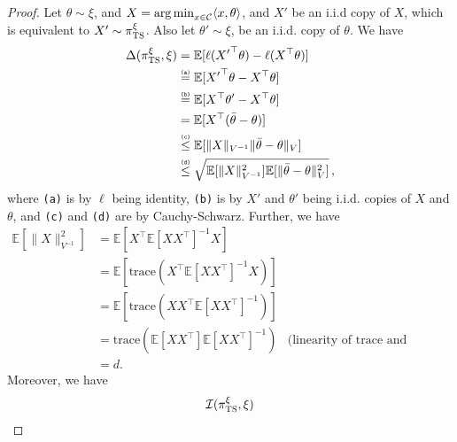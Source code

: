 \documentclass[letter, 12pt]{report}
\newcommand{\argmin}{\operatornamewithlimits{arg\,min}}
\newcommand{\explan}[1]{\stackrel{\text{\tiny \texttt{#1}}}}
\newcommand{\E}{\mathbb E}
\newcommand{\cC}{\mathcal C}
\newcommand{\I}{\mathcal{I}}
\newcommand{\1}{\mathbf{1}}
\newcommand{\ts}{\textsc{TS}\xspace}
\theoremstyle{plain}
\theoremstyle{definition}
\theoremstyle{remark}
\begin{document}
\begin{proof}
    Let $\theta \sim \xi$, and
    $X = \argmin_{x \in \cC} \langle x, \theta\rangle$,
    and $X'$ be an i.i.d copy of $X$, which is equivalent
    to $X' \sim \pi_\ts^\xi$. Also let $\theta' \sim \xi$,
    be an i.i.d. copy of $\theta$. We have
    \begin{align*}
        \Delta(\pi^\xi_\ts, \xi)
         & =
        \E[
            \ell({X'}^\top \theta) - \ell(X^\top \theta)
        ]    \\
         &
        \explan{(a)}
        =
        \E[
            {X'}^\top \theta - X^\top \theta
        ]    \\
         &
        \explan{(b)}
        =\E[
            X^\top \theta' - X^\top \theta
        ]    \\
         &
        =\E[
            X^\top (\bar{\theta} - \theta)
        ]    \\
         &
        \explan{(c)}
        \leq
        \E[
        \|X\|_{V^{-1}} \|\bar{\theta} - \theta\|_{V}
        ]
        \\
         &
        \explan{(d)}
        \leq
        \sqrt{
        \E[\|X\|^2_{V^{-1}}]
        \E[\|\bar{\theta} - \theta\|^2_{V}]
        }\,,
    \end{align*}
    where \texttt{(a)} is by $\ell$ being identity,
    \texttt{(b)} is by $X'$ and $\theta'$ being i.i.d.
    copies of $X$ and $\theta$,
    and \texttt{(c)} and \texttt{(d)} are by Cauchy-Schwarz.
    Further, we have
    \begin{align*}
        \E\left[\|X\|_{V^{-1}}^2\right]
                                                    & =
        \E\left[X^\top \E[XX^\top]^{-1} X\right]                                                  \\
                                                    & =
        \E\left[\text{trace}(X^\top \E[XX^\top]^{-1} X)\right]                                    \\
                                                    & =
        \E\left[\text{trace}(X X^\top \E[XX^\top]^{-1})\right]                                    \\
                                                    & =
        \text{trace}(\E[X X^\top] \E[XX^\top]^{-1}) & \text{(linearity of trace and expectation)} \\
                                                    & =d.
    \end{align*}
    Moreover, we have
    \begin{align*}
        \I(\pi_\ts^\xi, \xi)

\end{align*}
\end{proof}
\end{document}
